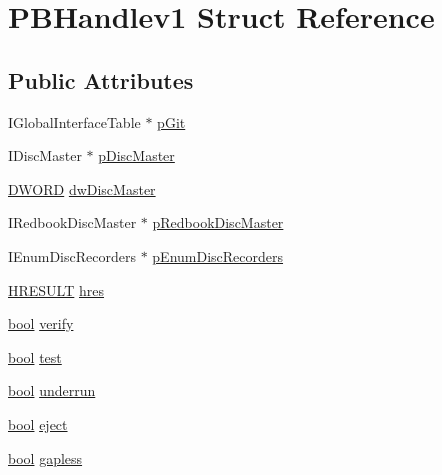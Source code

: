 \hypertarget{struct_p_b_handlev1}{}\section{P\+B\+Handlev1 Struct Reference}
\label{struct_p_b_handlev1}
\subsection*{Public Attributes}
\begin{DoxyCompactItemize}
\item 
I\+Global\+Interface\+Table $\ast$ \hyperlink{struct_p_b_handlev1_afcb21d2b76344e54d9240a70759b488c}{p\+Git}
\item 
I\+Disc\+Master $\ast$ \hyperlink{struct_p_b_handlev1_abc42c6380b3db318319ef6ecc2e3e3e3}{p\+Disc\+Master}
\item 
\hyperlink{mapinls_8h_ad342ac907eb044443153a22f964bf0af}{D\+W\+O\+RD} \hyperlink{struct_p_b_handlev1_a578fc9c6741b228094c455e185ee9e5a}{dw\+Disc\+Master}
\item 
I\+Redbook\+Disc\+Master $\ast$ \hyperlink{struct_p_b_handlev1_ac00aaf66ca78a71090db85ef7bee7070}{p\+Redbook\+Disc\+Master}
\item 
I\+Enum\+Disc\+Recorders $\ast$ \hyperlink{struct_p_b_handlev1_a2e999b1dc623c34d38b3164acdba7258}{p\+Enum\+Disc\+Recorders}
\item 
\hyperlink{px__win__ds_8c_a6ad46d30b0323d7b029e41f32f8a2571}{H\+R\+E\+S\+U\+LT} \hyperlink{struct_p_b_handlev1_ae58a4f41ed8e5c60d4d51c03038b24eb}{hres}
\item 
\hyperlink{mac_2config_2i386_2lib-src_2libsoxr_2soxr-config_8h_abb452686968e48b67397da5f97445f5b}{bool} \hyperlink{struct_p_b_handlev1_ab08a0c69301ab6e5fb6277de01413dc3}{verify}
\item 
\hyperlink{mac_2config_2i386_2lib-src_2libsoxr_2soxr-config_8h_abb452686968e48b67397da5f97445f5b}{bool} \hyperlink{struct_p_b_handlev1_a9359934b13e27789d6ffe94678ae92ae}{test}
\item 
\hyperlink{mac_2config_2i386_2lib-src_2libsoxr_2soxr-config_8h_abb452686968e48b67397da5f97445f5b}{bool} \hyperlink{struct_p_b_handlev1_ab0f960395689a7f26aea98a899b32b7f}{underrun}
\item 
\hyperlink{mac_2config_2i386_2lib-src_2libsoxr_2soxr-config_8h_abb452686968e48b67397da5f97445f5b}{bool} \hyperlink{struct_p_b_handlev1_a8037534f1e2ec1565fa8a9f0d9806fbe}{eject}
\item 
\hyperlink{mac_2config_2i386_2lib-src_2libsoxr_2soxr-config_8h_abb452686968e48b67397da5f97445f5b}{bool} \hyperlink{struct_p_b_handlev1_a0ab8c8b42cdee4426700b09da163d0a8}{gapless}

\end{DoxyCompactItemize}
